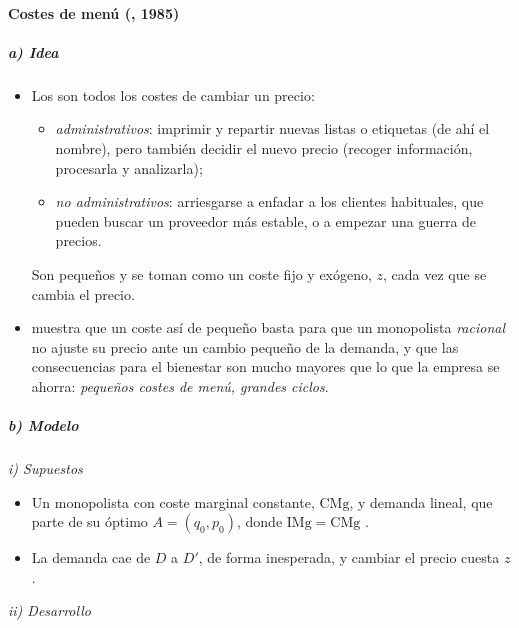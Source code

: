 \documentclass[11pt]{article}
\begin{document}
\paragraph{Costes de menú (, 1985)}

\subparagraph{a) Idea}

\begin{itemize}
\item Los  son todos los costes de cambiar un precio:
  \begin{itemize}
  \item \emph{administrativos}: imprimir y repartir nuevas listas o etiquetas (de ahí el nombre), pero también decidir el nuevo precio (recoger información, procesarla y analizarla);
  \item \emph{no administrativos}: arriesgarse a enfadar a los clientes habituales, que pueden buscar un proveedor más estable, o a empezar una guerra de precios.
  \end{itemize}
  Son pequeños y se toman como un coste fijo y exógeno, $z$, cada vez que se cambia el precio.
\item \textcite{Mankiw1985Small} muestra que un coste así de pequeño basta para que un monopolista \emph{racional} no ajuste su precio ante un cambio pequeño de la demanda, y que las consecuencias para el bienestar son mucho mayores que lo que la empresa se ahorra: \emph{pequeños costes de menú, grandes ciclos}.
\end{itemize}

\subparagraph{b) Modelo}

\hspace*{3.6em}\emph{i) Supuestos}

\begin{itemize}
\item Un monopolista con coste marginal constante, $\mathrm{CMg}$, y demanda lineal, que parte de su óptimo $A=(q_0,p_0)$, donde $\mathrm{IMg}=\mathrm{CMg}$ .
\item La demanda cae de $D$ a $D'$, de forma inesperada, y cambiar el precio cuesta $z$.
\end{itemize}

\hspace*{3.6em}\emph{ii) Desarrollo}
\end{document}
